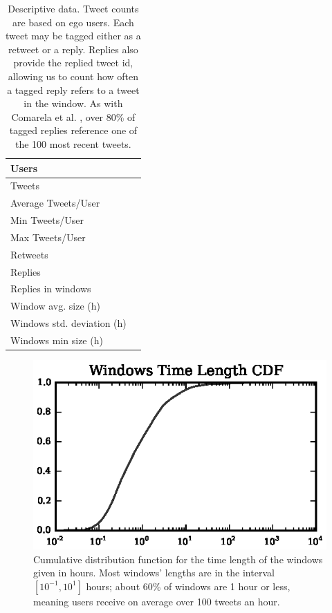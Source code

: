 \begin{table}[!tb]
	\centering
	\fontsize{9pt}{10pt}\selectfont
		\begin{tabular}{|l|c|}
			\hline
			Users & \totalUsers{} \\ \hline
			Tweets & \totalTweets{} \\ \hline
			Average Tweets/User & \averageTweetsUser{} \\ \hline
			Min Tweets/User & \minTweetsUser{} \\ \hline
			Max Tweets/User & \maxTweetsUser{} \\ \hline
			Retweets & \totalRetweets{} \\ \hline
			Replies & \totalReplies{} \\ \hline
			Replies in windows & \repliesInWindows{} \\ \hline
			Window avg. size (h) & \windowAverageSize{} \\ \hline
			Windows std. deviation (h) & \windowStdSize{} \\ \hline
			Windows min size (h) & \windowMinSize{} \\ \hline
		\end{tabular}
\caption{Descriptive data. Tweet counts are based on ego users. Each tweet may be tagged either as a retweet or a reply. Replies also provide the replied tweet id, allowing us to count how often a tagged reply refers to a tweet in the window.  As with Comarela et al.  \cite{Comarela2012}, over 80\% of tagged replies reference one of the 100 most recent tweets. }
	\label{tab:databaseInformation}
\end{table}

\begin{figure}[!htbp]
\centering
\includegraphics[scale=1]{./figures/window_time_size_histogram.eps}
\caption{Cumulative distribution function for the time length of the windows given in hours. Most windows' lengths are in the interval $[10^{-1}, 10^1]$ hours; about 60\% of windows are 1 hour or less, meaning users receive on average over 100 tweets an hour.}
\label{fig:window_time_size_histogram}
\end{figure}

